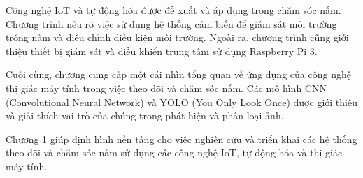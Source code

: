 Công nghệ IoT và tự động hóa được đề xuất và áp dụng trong chăm sóc nấm. Chương trình nêu rõ việc sử dụng hệ thống cảm biến để giám sát môi trường trồng nấm và điều chỉnh điều kiện môi trường. Ngoài ra, chương trình cũng giới thiệu thiết bị giám sát và điều khiển trung tâm sử dụng Raspberry Pi 3.

Cuối cùng, chương cung cấp một cái nhìn tổng quan về ứng dụng của công nghệ thị giác máy tính trong việc theo dõi và chăm sóc nấm. Các mô hình CNN (Convolutional Neural Network) và YOLO (You Only Look Once) được giới thiệu và giải thích vai trò của chúng trong phát hiện và phân loại ảnh.

Chương 1 giúp định hình nền tảng cho việc nghiên cứu và triển khai các hệ thống theo dõi và chăm sóc nấm sử dụng các công nghệ IoT, tự động hóa và thị giác máy tính.